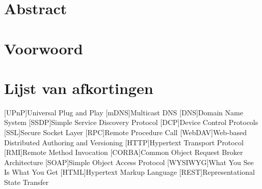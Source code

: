 %
%

\maketitle
{}


%
%

\chapter*{Abstract}
\label{chap:abstract}

%
%

\chapter*{Voorwoord}
\label{chap:voorwoord}


%
%

\setlength\cftpartnumwidth{2em}

\newpage

\label{chap:inhoudstafel}
\tableofcontents

\newpage



%
%

\listoffigures


%
%

\chapter*{Lijst van afkortingen}
\label{chap:afkortingen}

\begin{acronym}[WYSIWYG]	%

[UPnP]{Universal Plug and Play}
[mDNS]{Multicast DNS}
[DNS]{Domain Name System}
[SSDP]{Simple Service Discovery Protocol}
[DCP]{Device Control Protocols}
[SSL]{Secure Socket Layer}
[RPC]{Remote Procedure Call}
[WebDAV]{Web-based Distributed Authoring and Versioning}
[HTTP]{Hypertext Transport Protocol}
[RMI]{Remote Method Invocation}
[CORBA]{Common Object Request Broker Architecture}
[SOAP]{Simple Object Access Protocol}
[WYSIWYG]{What You See Is What You Get}
[HTML]{Hypertext Markup Language}
[REST]{Representational State Transfer}

\end{acronym}


